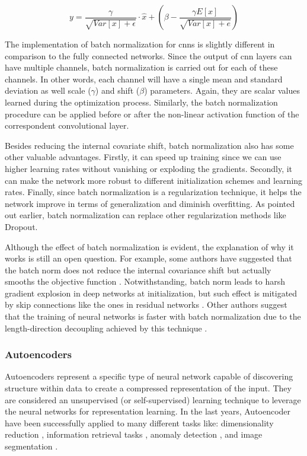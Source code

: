 \begin{equation}
\label{eq:bn_inf_yi}
y = \frac{\gamma}{\sqrt{Var[x] + \epsilon}} \cdot \hat{x} + \left( \beta - \frac{\gamma E[x]}{\sqrt{Var[x] + e}} \right)
\end{equation}

The implementation of batch normalization for \aclp{cnn} is slightly different in comparison to the fully connected networks. Since the output of \acs{cnn} layers can have multiple channels, batch normalization is carried out for each of these channels. In other words, each channel will have a single mean and standard deviation as well scale ($\gamma$) and shift ($\beta$) parameters. Again, they are scalar values learned during the optimization process. Similarly, the batch normalization procedure can be applied before or after the non-linear activation function of the correspondent convolutional layer.

Besides reducing the internal covariate shift, batch normalization also has some other valuable advantages. Firstly, it can speed up training since we can use higher learning rates without vanishing or exploding the gradients. Secondly, it can make the network more robust to different initialization schemes and learning rates. Finally, since batch normalization is a regularization technique, it helps the network improve in terms of generalization and diminish overfitting. As pointed out earlier, batch normalization can replace other regularization methods like Dropout.

Although the effect of batch normalization is evident, the explanation of why it works is still an open question. For example, some authors have suggested that the batch norm does not reduce the internal covariance shift but actually smooths the objective function \citep{santurkar2018does}. Notwithstanding, batch norm leads to harsh gradient explosion in deep networks at initialization, but such effect is mitigated by skip connections like the ones in residual networks \citep{yang2019mean}. Other authors suggest that the training of neural networks is faster with batch normalization due to the length-direction decoupling achieved by this technique \citep{kohler2019exponential}.

\subsubsection{Autoencoders}

Autoencoders represent a specific type of neural network capable of discovering structure within data to create a compressed representation of the input. They are considered an unsupervised (or self-supervised) learning technique to leverage the neural networks for representation learning. In the last years, Autoencoder have been successfully applied to many different tasks like: dimensionality reduction \citep{petscharnig2017dimensionality, wang2015dimensionality}, information retrieval tasks \citep{pfeiffer2018neural}, anomaly detection \citep{sakurada2014anomaly}, and image segmentation \citep{baur2018deep, karimpouli2019segmentation}.

